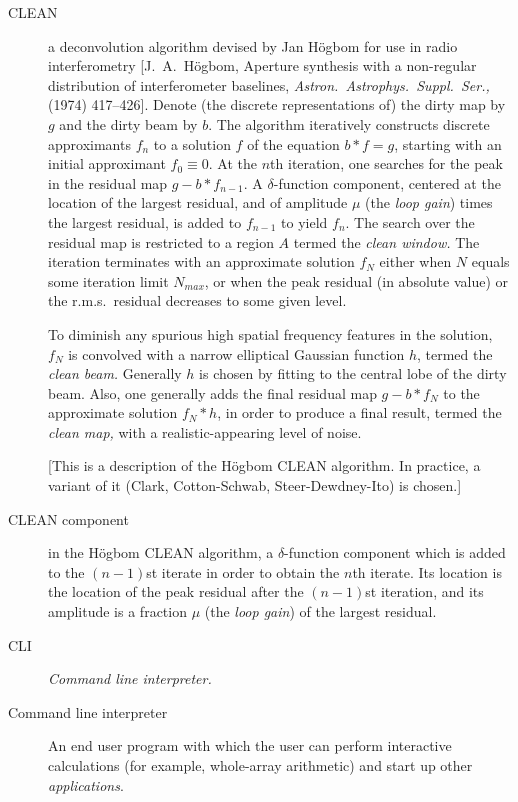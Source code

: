 \begin{description}
\item[CLEAN]
a deconvolution algorithm
devised by Jan H\"ogbom for use in radio interferometry
[J.~A.~H\"ogbom, Aperture synthesis with a non-regular
distribution of interferometer baselines, {\it Astron.\ Astrophys.\
Suppl.\ Ser.,}  (1974) 417--426].
Denote (the discrete representations of) the dirty map by $g$
and the dirty beam by $b$.
The algorithm iteratively constructs discrete approximants $f_n$
to a solution $f$ of the equation $b\ast f=g$,
starting with an initial approximant $f_0\equiv0$.
At the $n$th iteration, one searches for the peak in the
residual map $g-b\ast f_{n-1}$.
A $\delta$-function component, centered at the location of the largest
residual, and of amplitude $\mu$ (the {\it loop gain}\/)
times the largest residual, is added to $f_{n-1}$ to yield $f_n$.
The search over the residual map is restricted to a region $A$
termed the {\it clean window.}
The iteration terminates with an approximate solution $f_N$
either when $N$ equals some iteration limit $N_{max}$,
or when the peak residual (in absolute value) or the r.m.s.\
residual decreases to some given level.
\par
To diminish any spurious high spatial frequency features in
the solution, $f_N$ is convolved with a narrow elliptical Gaussian
function $h$, termed the {\it clean beam.}
Generally $h$ is chosen by fitting to the central lobe of the
dirty beam.
Also, one generally adds the final residual map $g-b\ast f_N$
to the approximate solution $f_N\ast h$, in order to produce
a final result, termed the {\it clean map,} with a
realistic-appearing level of noise.

[This is a description of the H\"ogbom CLEAN algorithm. In practice, a
variant of it (Clark, Cotton-Schwab, Steer-Dewdney-Ito) is chosen.]


\item[CLEAN component]
in the H\"ogbom CLEAN algorithm, a $\delta$-function component which
is added to the $(n-1)$st iterate in order to obtain
the $n$th iterate.
Its location is the location of the peak residual after the
$(n-1)$st iteration, and its amplitude is a fraction
$\mu$ (the {\it loop gain}\/) of the largest residual.


\item[CLI] {\em Command line interpreter.}


\item[Command line interpreter] An end user program with which the
user can perform interactive calculations (for example, whole-array
arithmetic) and start up other {\em applications}.



\end{description}
